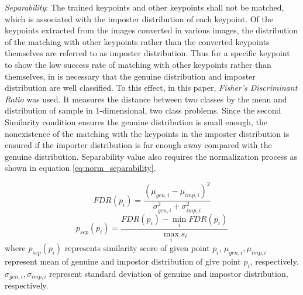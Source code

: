 
\textit{Separability}: The trained keypoints and other keypoints shall not be matched, which is associated with the imposter distribution of each keypoint. Of the keypoints extracted from the images converted in various images, the distribution of the matching with other keypoints rather than the converted keypoints themselves are referred to as imposter distribution. Thus for a specific keypoint to show the low success rate of matching with other keypoints rather than themselves, in is necessary that the genuine distribution and imposter distribution are well classified. To this effect, in this paper, \textit{Fisher's Discriminant Ratio\cite{fisher_use_1936}} was used. It measures the distance between two classes by the mean and distribution of sample in 1-dimensional, two class problems. Since the second Similarity condition ensures the genuine distribution is small enough, the nonexistence of the matching with the keypoints in the imposter distribution is ensured if the importer distribution is far enough away compared with the genuine distribution. Separability value also requires the normalization process as shown in equation \eqref{eq:norm_separability}.  


\begin{equation}
FDR(p_i) = \frac{(\mu_{gen,i} - \mu_{imp, i})^2}{\sigma_{gen, i}^2 + \sigma_{imp, i}^2}
\end{equation}
\begin{equation}\label{eq:norm_separability}
p_{sep}(p_i) = \frac{FDR(p_i) - \min_i {FDR(p_i)}}{\max_{i} {s_i}}
\end{equation}	
where $p_{sep}(p_i)$ represents similarity score of given point $p_i$, $\mu_{gen, i}, \mu_{imp, i}$ represent mean of genuine and impostor distribution of give point $p_i$, respectively. $\sigma_{gen,i}, \sigma_{imp, i}$ represent standard deviation of genuine and impostor distribution, respectively.


